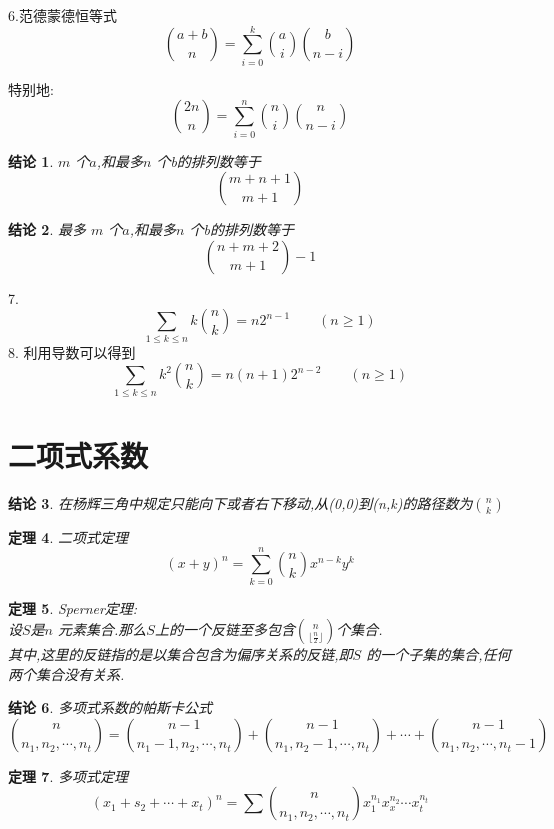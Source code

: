 \documentclass[12pt, a4paper, oneside]{ctexbook}
\newtheorem{theorem}{定理}[section]
\newtheorem{proposition}[theorem]{结论}
\newcommand{\newp}[1]{\vspace{#1\baselineskip}\noindent}
\begin{document}
6.范德蒙德恒等式
$$
\binom{a+b}{n}=\sum_{i=0}^{k}\binom{a}{i}\binom{b}{n-i}
$$

特别地:
$$
\binom{2n}{n}=\sum_{i=0}^{n}\binom{n}{i}\binom{n}{n-i}
$$

\begin{proposition}
$m$ 个$a$,和最多$n$ 个b的排列数等于
$$
\binom{m+n+1}{m+1} 
$$
\end{proposition}

\begin{proposition}
  最多 $m$ 个$a$,和最多$n$ 个b的排列数等于
  $$
  \binom{n+m+2}{m+1}-1
  $$
\end{proposition}

7.
$$
\sum_{1\le k \le n} k\binom{n}{k} =n2^{n-1} \qquad (n\ge 1)
$$
8.
利用导数可以得到
$$
\sum_{1\le k \le n} k^2 \binom{n}{k} =n(n+1)2^{n-2}  \qquad (n\ge 1)
$$

\newp{3}

\section{二项式系数}

\begin{proposition}
在杨辉三角中规定只能向下或者右下移动,从(0,0)到(n,k)的路径数为$\binom{n}{k}$
\end{proposition}

\begin{theorem}
二项式定理
$$
(x+y)^n=\sum_{k=0}^{n}\binom{n}{k} x^{n-k}y^k
$$
\end{theorem}

\begin{theorem}
Sperner定理:\\
设$S$是$n$ 元素集合.那么$S$上的一个反链至多包含$\binom{n}{\lfloor \frac{n}{2} \rfloor} $个集合.\\
其中,这里的反链指的是以集合包含为偏序关系的反链,即$S$ 的一个子集的集合,任何两个集合没有关系.
\end{theorem}

\begin{proposition}
多项式系数的帕斯卡公式
$$
\binom{n}{n_1,n_2,\cdots,n_t}=\binom{n-1}{n_1-1,n_2,\cdots,n_t}+\binom{n-1}{n_1,n_2-1,\cdots,n_t}+\cdots+\binom{n-1}{n_1,n_2,\cdots,n_t-1}
$$
\end{proposition}

\begin{theorem}
多项式定理
$$
(x_1+s_2+\cdots+x_t)^n=\sum \binom{n}{n_1,n_2,\cdots,n_t}x_1^{n_1}x_x^{n_2}\cdots x_t^{n_t}
$$
\end{theorem}
\end{document}

